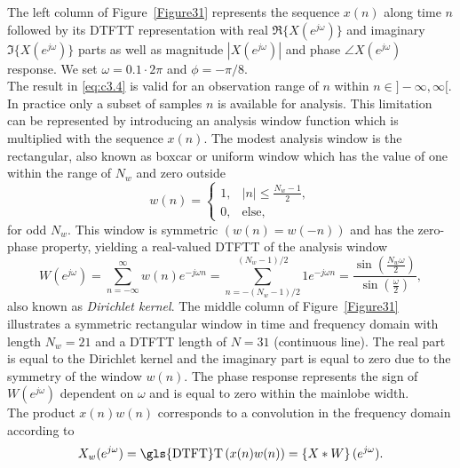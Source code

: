 \noindent The left column of Figure~\ref{Figure31} represents the sequence $x(n)$ along time $n$ followed by its \gls{DTFT}T representation with real $\Re\{X(e^{j\omega})\}$ and imaginary $\Im\{X(e^{j\omega})\}$ parts as well as magnitude $|X(e^{j\omega})|$ and phase $\angle X(e^{j\omega})$ response. We set $\omega=0.1\cdot2\pi$ and $\phi=-\pi/8$.\\

\noindent The result in \eqref{eq:c3.4} is valid for an observation range of $n$ within $n\in]-\infty,\infty[$. In practice only a subset of samples $n$ is available for analysis. This limitation can be represented by introducing an analysis window function which is multiplied with the sequence $x(n)$. The modest analysis window is the rectangular, also known as boxcar or uniform window which has the value of one within the range of $N_w$ and zero outside
\begin{equation}\label{eq:c3.5}
w(n)=\begin{cases}1, & |n|\leq\frac{N_w-1}{2},\\
0, & \text{else},
\end{cases}
\end{equation}
for odd $N_w$.
This window is symmetric $(w(n)=w(-n))$ and has the zero-phase property, yielding a real-valued \gls{DTFT}T of the analysis window
\begin{equation}\label{eq:c3.6}
W(e^{j\omega})=\sum_{n=-\infty}^{\infty}w(n)e^{-j\omega n}=\sum_{n=-(N_w-1)/{2}}^{(N_w-1)/{2}}1e^{-j\omega n}=\frac{\sin\left(\frac{N_w\omega}{2}\right)}{\sin\left(\frac{\omega}{2}\right)},
\end{equation}
also known as \textit{Dirichlet kernel}. The middle column of Figure~\ref{Figure31} illustrates a symmetric rectangular window in time and frequency domain with length $N_w=21$ and a \gls{DTFT}T length of $N=31$ (continuous line). The real part is equal to the Dirichlet kernel and the imaginary part is equal to zero due to the symmetry of the window $w(n)$. The phase response represents the sign of $W(e^{j\omega})$ dependent on $\omega$ and is equal to zero within the mainlobe width.\\

\noindent The product $x(n)w(n)$ corresponds to a convolution in the frequency domain according to
\begin{equation}\label{eq:c1.7}
X_w(e^{j\omega})=\text{\gls{DTFT}T}\left(x(n)w(n)\right)=\left\{X\ast W\right\}(e^{j\omega}).
\end{equation}

